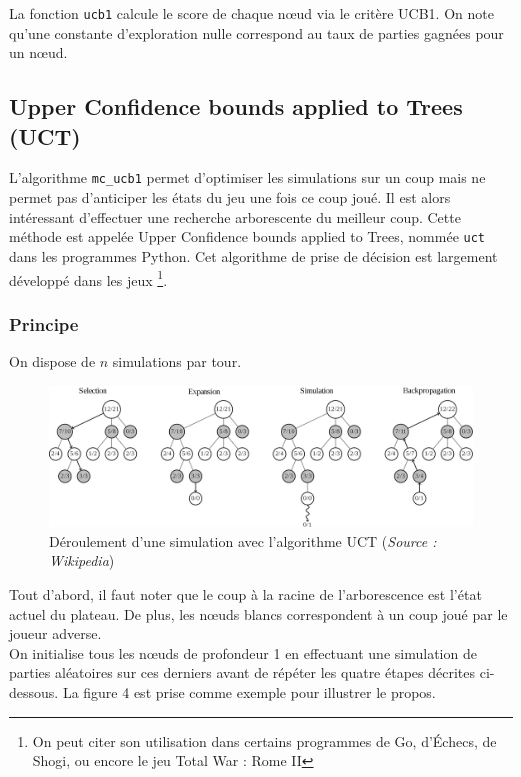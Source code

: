 \documentclass[a4paper]{article}
\theoremstyle{definition}
\begin{document}
La fonction \texttt{ucb1} calcule le score de chaque nœud via le critère UCB1. On note qu'une constante d'exploration nulle correspond au taux de parties gagnées pour un nœud.

\subsection{Upper Confidence bounds applied to Trees (UCT)}

L'algorithme \texttt{mc\_ucb1} permet d'optimiser les simulations sur un coup mais ne permet pas d'anticiper les états du jeu une fois ce coup joué. Il est alors intéressant d'effectuer une recherche arborescente du meilleur coup. Cette méthode est appelée Upper Confidence bounds applied to Trees, nommée \texttt{uct} dans les programmes Python. Cet algorithme de prise de décision est largement développé dans les jeux \footnote{On peut citer son utilisation dans certains programmes de Go, d'Échecs, de Shogi, ou encore le jeu Total War : Rome II}.

\subsubsection{Principe}

On dispose de $n$ simulations par tour.
\begin{figure}[h]
\centering
\includegraphics[scale=0.18]{MCTS_wikipedia.png}
\caption{Déroulement d'une simulation avec l'algorithme UCT (\textit{Source : Wikipedia})}
\label{fig:uct}
\end{figure}

Tout d'abord, il faut noter que le coup à la racine de l'arborescence est l'état actuel du plateau. De plus, les nœuds blancs correspondent à un coup joué par le joueur adverse.\\
On initialise tous les nœuds de profondeur 1 en effectuant une simulation de parties aléatoires sur ces derniers avant de répéter les quatre étapes décrites ci-dessous. La figure 4 est prise comme exemple pour illustrer le propos.\\
\end{document}
